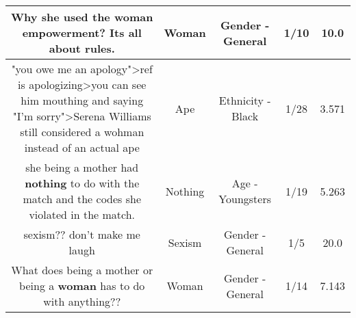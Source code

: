 \documentclass[11pt]{article}
\newlength\mylength
\begin{document}
\begin{center}
\begin{longtable}{|C{.65\mylength}|C{.30\mylength}|C{.12\mylength}|C{.12\mylength}|C{.12\mylength}|}
  \small Why she used the \textbf{woman} empowerment? Its all about rules.\normalsize   & Woman & Gender - General & 1/10 & 10.0 \\  \hline
  \small "you owe me an apology">ref is apologizing>you can see him mouthing and saying "I'm sorry">Serena Williams still considered a wohman instead of an actual ape\normalsize   & Ape & Ethnicity - Black & 1/28 & 3.571 \\  \hline
  \small she being a mother had \textbf{nothing} to do with the match and the codes she violated in the match.\normalsize   & Nothing & Age - Youngsters & 1/19 & 5.263 \\  \hline
  \small sexism?? don't make me laugh\normalsize   & Sexism & Gender - General & 1/5 & 20.0 \\  \hline
  \small What does being a mother or being a \textbf{woman} has to do with anything??\normalsize   & Woman & Gender - General & 1/14 & 7.143 \\  \hline

\end{longtable}
\end{center}
\end{document}
